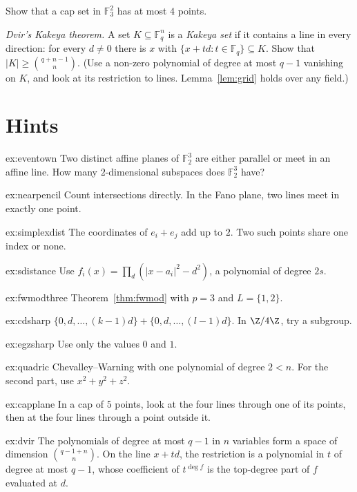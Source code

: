 \begin{exercise}[$\star\star$]\label{ex:capplane}
Show that a cap set in $\mathbb F_3^2$ has at most $4$ points.
\end{exercise}

\begin{exercise}[$\star\star\star$]\label{ex:dvir}
\emph{Dvir's Kakeya theorem.} A set $K\subseteq\mathbb F_q^n$ is a \emph{Kakeya set} if it contains a line in every direction: for every $d\ne0$ there is $x$ with $\{x+td:t\in\mathbb F_q\}\subseteq K$. Show that
$|K|\ge\binom{q+n-1}n$. (Use a non-zero polynomial of degree at most $q-1$ vanishing on $K$, and look at its restriction to lines. Lemma~\ref{lem:grid} holds over any field.)
\end{exercise}

\section{Hints}

\begin{hint}{ex:eventown}
Two distinct affine planes of $\mathbb F_2^3$ are either parallel or meet in an affine line. How many $2$-dimensional subspaces does $\mathbb F_2^3$ have?
\end{hint}
\begin{hint}{ex:nearpencil}
Count intersections directly. In the Fano plane, two lines meet in exactly one point.
\end{hint}
\begin{hint}{ex:simplexdist}
The coordinates of $e_i+e_j$ add up to $2$. Two such points share one index or none.
\end{hint}
\begin{hint}{ex:sdistance}
Use $f_i(x)=\prod_{d}(|x-a_i|^2-d^2)$, a polynomial of degree $2s$.
\end{hint}
\begin{hint}{ex:fwmodthree}
Theorem~\ref{thm:fwmod} with $p=3$ and $L=\{1,2\}$.
\end{hint}
\begin{hint}{ex:cdsharp}
$\{0,d,\dots,(k-1)d\}+\{0,d,\dots,(l-1)d\}$. In $\Z/4\Z$, try a subgroup.
\end{hint}
\begin{hint}{ex:egzsharp}
Use only the values $0$ and $1$.
\end{hint}
\begin{hint}{ex:quadric}
Chevalley--Warning with one polynomial of degree $2<n$. For the second part, use $x^2+y^2+z^2$.
\end{hint}
\begin{hint}{ex:capplane}
In a cap of $5$ points, look at the four lines through one of its points, then at the four lines through a point outside it.
\end{hint}
\begin{hint}{ex:dvir}
The polynomials of degree at most $q-1$ in $n$ variables form a space of dimension $\binom{q-1+n}n$. On the line $x+td$, the restriction is a polynomial in $t$ of degree at most $q-1$, whose coefficient
of $t^{\deg f}$ is the top-degree part of $f$ evaluated at $d$.
\end{hint}

